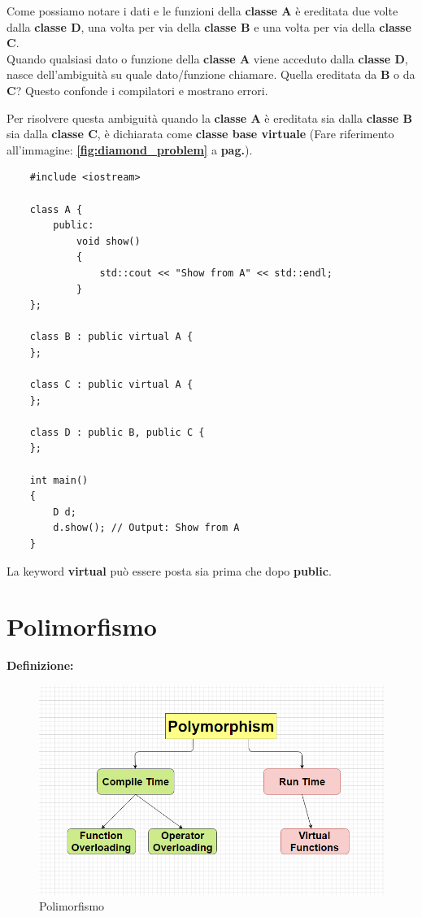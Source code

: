 \textsf{\small Come possiamo notare i dati e le funzioni della \textbf{classe A} è ereditata due volte dalla \textbf{classe D}, una volta per via della \textbf{classe B} e una volta per via della \textbf{classe C}.} \\

\textsf{\small Quando qualsiasi dato o funzione della \textbf{classe A} viene acceduto dalla \textbf{classe D}, nasce dell'ambiguità su quale dato/funzione chiamare. Quella ereditata da \textbf{B} o da \textbf{C}? Questo confonde i compilatori e mostrano errori.}

\textsf{\small Per risolvere questa ambiguità quando la \textbf{classe A} è ereditata sia dalla \textbf{classe B} sia dalla \textbf{classe C}, è dichiarata come \textbf{classe base virtuale} (Fare riferimento all'immagine: \textbf{\ref{fig:diamond_problem}} a \textbf{pag.\pageref{fig:diamond_problem}}).}

\begin{lstlisting}
	#include <iostream>
	
	class A {
		public:
			void show()
			{
				std::cout << "Show from A" << std::endl;
			}
	};

	class B : public virtual A {
	};

	class C : public virtual A {
	};

	class D : public B, public C {
	};

	int main()
	{
		D d;
		d.show(); // Output: Show from A
	}
\end{lstlisting}

\textsf{\small La keyword \textbf{virtual} può essere posta sia prima che dopo \textbf{public}.} \\



\section{Polimorfismo}

\textsf{\small \textbf{Definizione:} } \\

\begin{figure}[H]
	\centering
	\includegraphics[width=1\textwidth, height=1\textheight, keepaspectratio]{./imgs/polymorphism.png}
	\caption{Polimorfismo}
	\label{fig:polymorphism}
\end{figure}


